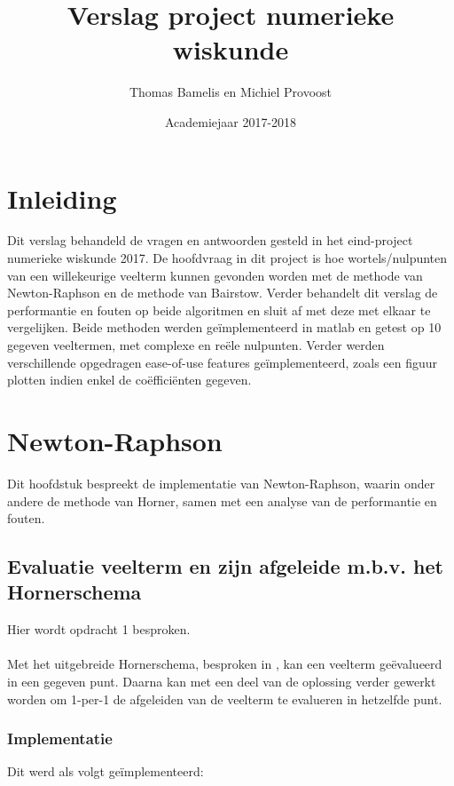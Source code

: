 \documentclass[a4paper,kulak]{kulakarticle}
\date{Academiejaar 2017-2018}
\title{Verslag project numerieke wiskunde}
\author{Thomas Bamelis en Michiel Provoost}
\begin{document}
\maketitle

\section*{Inleiding}

Dit verslag behandeld de vragen en antwoorden gesteld in het eind-project numerieke wiskunde 2017. De hoofdvraag in dit project is hoe wortels/nulpunten van een willekeurige veelterm kunnen gevonden worden met de methode van Newton-Raphson en de methode van Bairstow. Verder behandelt dit verslag de performantie en fouten op beide algoritmen en  sluit af met deze met elkaar te vergelijken. Beide methoden werden geïmplementeerd in matlab en getest op 10 gegeven veeltermen, met complexe en reële nulpunten. 
Verder werden verschillende opgedragen ease-of-use features geïmplementeerd, zoals een figuur plotten indien enkel de coëfficiënten gegeven.

\section{Newton-Raphson}
Dit hoofdstuk bespreekt de implementatie van Newton-Raphson, waarin onder andere de methode van Horner, samen met een analyse van de performantie en fouten.

\subsection{Evaluatie veelterm en zijn afgeleide m.b.v. het Hornerschema}
Hier wordt opdracht 1 besproken. \\~\\
Met het uitgebreide Hornerschema, besproken in \cite{bultheel2006inleiding}, kan een veelterm geëvalueerd in een gegeven punt. Daarna kan met een deel van de oplossing verder gewerkt worden om 1-per-1 de afgeleiden van de veelterm te evalueren in hetzelfde punt.\\

\subsubsection{Implementatie}

Dit werd als volgt geïmplementeerd:\\


\end{document}
